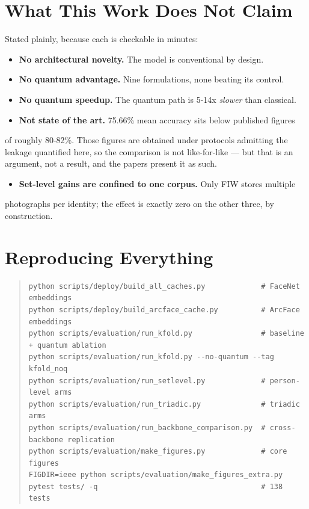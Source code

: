 \documentclass[11pt,a4paper]{article}
\begin{document}
\section*{What This Work Does Not Claim}

Stated plainly, because each is checkable in minutes:

\begin{itemize}\setlength{\itemsep}{2pt}
\item \textbf{No architectural novelty.} The model is conventional by design.
\item \textbf{No quantum advantage.} Nine formulations, none beating its control.
\item \textbf{No quantum speedup.} The quantum path is 5-14x \emph{slower} than classical.
\item \textbf{Not state of the art.} 75.66\% mean accuracy sits below published figures
\end{itemize}

  of roughly 80-82\%. Those figures are obtained under protocols admitting the
  leakage quantified here, so the comparison is not like-for-like — but that is
  an argument, not a result, and the papers present it as such.
\begin{itemize}\setlength{\itemsep}{2pt}
\item \textbf{Set-level gains are confined to one corpus.} Only FIW stores multiple
\end{itemize}

  photographs per identity; the effect is exactly zero on the other three, by
  construction.



\section*{Reproducing Everything}

\begin{quote}\small\begin{verbatim}
python scripts/deploy/build_all_caches.py             # FaceNet embeddings
python scripts/deploy/build_arcface_cache.py          # ArcFace embeddings
python scripts/evaluation/run_kfold.py                # baseline + quantum ablation
python scripts/evaluation/run_kfold.py --no-quantum --tag kfold_noq
python scripts/evaluation/run_setlevel.py             # person-level arms
python scripts/evaluation/run_triadic.py              # triadic arms
python scripts/evaluation/run_backbone_comparison.py  # cross-backbone replication
python scripts/evaluation/make_figures.py             # core figures
FIGDIR=ieee python scripts/evaluation/make_figures_extra.py
pytest tests/ -q                                      # 138 tests
\end{verbatim}\end{quote}
\end{document}
